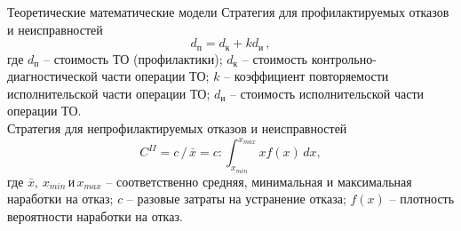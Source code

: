 \documentclass{beamer}
\begin{document}
\begin{frame}
	{Теоретические математические модели}
    Стратегия для профилактируемых отказов и неисправностей
    \begin{equation*}
        d_{\text{п}} = d_{\text{к}} + k d_{\text{и}}\,,
    \end{equation*}
    {\footnotesize
        где $d_{\text{п}}$ -- стоимость ТО (профилактики); $d_{\text{к}}$ --
        стоимость контрольно-диагностической части операции ТО; $k$ --
        коэффициент повторяемости исполнительской части операции ТО;
        $d_{\text{и}}$ -- стоимость исполнительской части операции ТО.
    }
    \\[\baselineskip]
    Стратегия для непрофилактируемых отказов и неисправностей
    \begin{equation*}
        C^{II} =
        c\,/\,\bar{x} =
        c : \int_{x_{min}}^{x_{max}} x f(x)\,dx,
    \end{equation*}
    {\footnotesize
        где $\bar{x},\,x_{min} \,\text{и} \,x_{max}$ -- соответственно средняя,
        минимальная и максимальная наработки на отказ; $c$ -- разовые затраты на
        устранение отказа; $f(x)$ -- плотность вероятности наработки на отказ.
    }
\end{frame}
\end{document}
